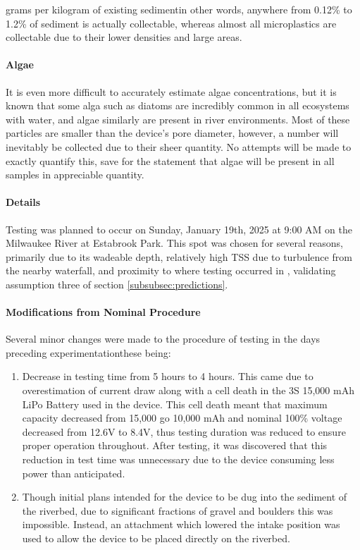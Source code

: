 \documentclass[fleqn,10pt]{SelfArx} %
\begin{document}
grams per kilogram of existing sediment\textemdash in other words, anywhere from 0.12\% to 1.2\% of sediment is actually collectable, whereas almost all microplastics are collectable due to their lower densities and large areas.
	\paragraph{Algae}
	It is even more difficult to accurately estimate algae concentrations, but it is known that some alga such as diatoms are incredibly common in all ecosystems with water, and algae similarly are present in river environments. Most of these particles are smaller than the device's pore diameter, however, a number will inevitably be collected due to their sheer quantity. No attempts will be made to exactly quantify this, save for the statement that algae will be present in all samples in appreciable quantity. 
	\paragraph*{Details}
	Testing was planned to occur on Sunday, January 19th, 2025 at 9:00 AM on the Milwaukee River at Estabrook Park. This spot was chosen for several reasons, primarily due to its wadeable depth, relatively high TSS due to turbulence from the nearby waterfall, and proximity to where testing occurred in \cite{LenakerEtAlvertdist}, validating assumption three of section \ref{subsubsec:predictions}. 
	\paragraph*{Modifications from Nominal Procedure}
	\label{sec:mods}
	Several minor changes were made to the procedure of testing in the days preceding experimentation\textemdash these being:
	\begin{enumerate}
		\item Decrease in testing time from 5 hours to 4 hours. This came due to overestimation of current draw along with a cell death in the 3S 15,000 mAh LiPo Battery used in the device. This cell death meant that maximum capacity decreased from 15,000 go 10,000 mAh and nominal 100\% voltage decreased from 12.6V to 8.4V, thus testing duration was reduced to ensure proper operation throughout. After testing, it was discovered that this reduction in test time was unnecessary due to the device consuming less power than anticipated. 
		\item Though initial plans intended for the device to be dug into the sediment of the riverbed, due to significant fractions of gravel and boulders this was impossible. Instead, an attachment which lowered the intake position was used to allow the device to be placed directly on the riverbed. 
	\end{enumerate}
\end{document}
